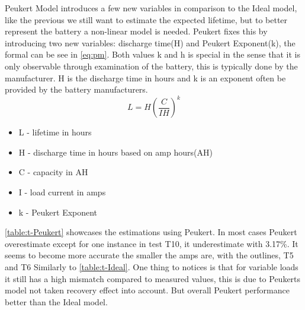 Peukert Model introduces a few new variables in comparison to the Ideal model, like the previous we still want to estimate the expected lifetime, but to better represent the battery a non-linear model is needed. Peukert fixes this by introducing two new variables: discharge time(H) and Peukert Exponent(k), the formal can be see in \cref{eq:pm}. Both values k and h is special in the sense that it is only observable through examination of the battery, this is typically done by the manufacturer. H is the discharge time in hours and k is an exponent often be provided by the battery manufacturers.
\begin{equation}\label{eq:pm}
L=H(\frac{C}{IH})^k
\end{equation}
\begin{itemize}
	\item L - lifetime in hours
	\item H - discharge time in hours based on amp hours(AH)
	\item C - capacity in AH
	\item I - load current in amps
	\item k - Peukert Exponent
\end{itemize}

\cref{table:t-Peukert} showcases the estimations using Peukert. In most cases Peukert overestimate except for one instance in test T10, it underestimate with 3.17\%. It seems to become more accurate the smaller the amps are, with the outlines, T5 and T6 Similarly to \cref{table:t-Ideal}. One thing to notices is that for variable loads it still has a high mismatch compared to measured values, this is due to Peukerts model not taken recovery effect into account. But overall Peukert performance better than the Ideal model.

